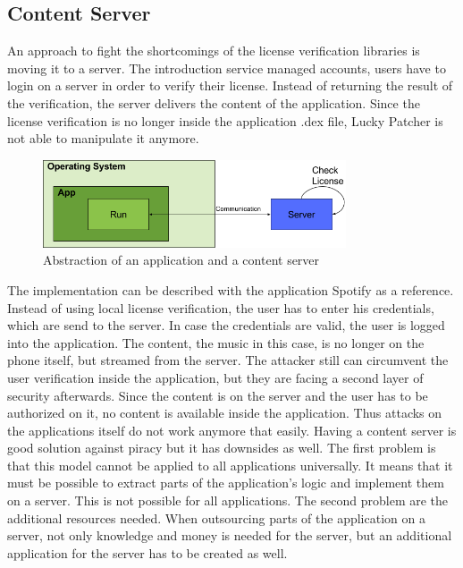 \subsection{Content Server} \label{section:counter-replace-server}
An approach to fight the shortcomings of the license verification libraries is moving it to a server.
The introduction service managed accounts, users have to login on a server in order to verify their license.
Instead of returning the result of the verification, the server delivers the content of the application.
Since the license verification is no longer inside the application \gls{.dex} file, Lucky Patcher is not able to manipulate it anymore.
\newline
\begin{figure}[h]
    \centering
    \includegraphics[width=0.8\textwidth]{data/contentServer.png}
    \caption{Abstraction of an application and a content server}
    \label{fig:contentServer}
\end{figure}
The implementation can be described with the application Spotify \cite{spotify} as a reference.
Instead of using local license verification, the user has to enter his credentials, which are send to the server.
In case the credentials are valid, the user is logged into the application.
The content, the music in this case, is no longer on the phone itself, but streamed from the server.
The attacker still can circumvent the user verification inside the application, but they are facing a second layer of security afterwards.
Since the content is on the server and the user has to be authorized on it, no content is available inside the application.
Thus attacks on the applications itself do not work anymore that easily.
\newline
Having a content server is good solution against piracy but it has downsides as well.
The first problem is that this model cannot be applied to all applications universally.
It means that it must be possible to extract parts of the application's logic and implement them on a server.
This is not possible for all applications.
The second problem are the additional resources needed.
When outsourcing parts of the application on a server, not only knowledge and money is needed for the server, but an additional application for the server has to be created as well.
